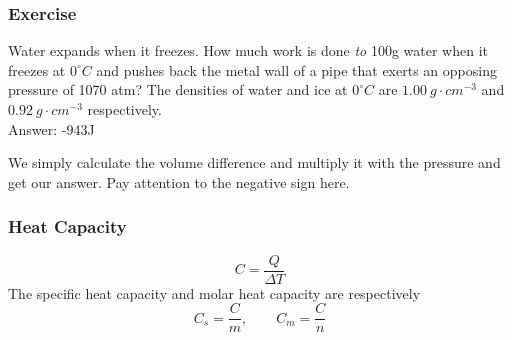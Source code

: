 \documentclass[aspectratio=169]{beamer}
\def\blankline{\\[6pt]}
\begin{document}
  \begin{frame}
    \frametitle{Exercise}
    Water expands when it freezes. How much work is done \textit{to} 100g water when it freezes at $0^{\circ}C$ and pushes back the metal wall
    of a pipe that exerts an opposing pressure of 1070 atm? The densities of water and ice at $0^{\circ}C$ are $1.00\ g\cdot cm^{-3}$ 
    and $0.92\ g\cdot cm^{-3}$ respectively. \pause
    \blankline
    Answer: -943J

    We simply calculate the volume difference and multiply it with the pressure and get our answer.
    Pay attention to the negative sign here.
  \end{frame}
  \begin{frame}
    \frametitle{Heat Capacity}
    $$C = \frac{Q}{\Delta T}$$
    The specific heat capacity and molar heat capacity are respectively
    $$C_{s} = \frac{C}{m}, \qquad C_m = \frac{C}{n} $$
  \end{frame}
\end{document}
